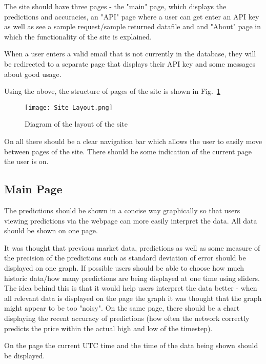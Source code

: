        The site should have three pages - the "main" page, which displays the predictions and accuracies, an "API" page where a user can get enter an API key as well as see a sample request/sample returned datafile and and "About" page in which the functionality of the site is explained.

        When a user enters a valid email that is not currently in the database, they will be redirected to a separate page that displays their API key and some messages about good usage.

        Using the above, the structure of pages of the site is shown in Fig.~\ref{fig:site_layout}

        \begin{figure}[h]
            \centering
            \texttt{[image: Site Layout.png]}
            \caption{Diagram of the layout of the site}
            \label{fig:site_layout}
        \end{figure}

        On all there should be a clear navigation bar which allows the user to easily move between pages of the site. There should be some indication of the current page the user is on.

        \subsection{Main Page}
        The predictions should be shown in a concise way graphically so that users viewing predictions via the webpage can more easily interpret the data. All data should be shown on one page.
        
        It was thought that previous market data, predictions as well as some measure of the precision of the predictions such as standard deviation of error should be displayed on one graph. If possible users should be able to choose how much historic data/how many predictions are being displayed at one time using sliders. The idea behind this is that it would help users interpret the data better - when all relevant data is displayed on the page the graph it was thought that the graph might appear to be too "noisy". On the same page, there should be a chart displaying the recent accuracy of predictions (how often the network correctly predicts the price within the actual high and low of the timestep). 

        On the page the current UTC time and the time of the data being shown should be displayed.

